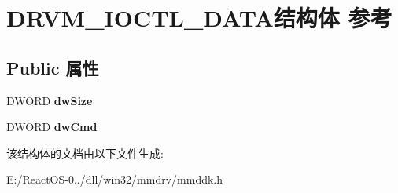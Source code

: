 \hypertarget{struct_d_r_v_m___i_o_c_t_l___d_a_t_a}{}\section{D\+R\+V\+M\+\_\+\+I\+O\+C\+T\+L\+\_\+\+D\+A\+T\+A结构体 参考}
\label{struct_d_r_v_m___i_o_c_t_l___d_a_t_a}
\subsection*{Public 属性}
\begin{DoxyCompactItemize}
\item 
\mbox{\label{struct_d_r_v_m___i_o_c_t_l___d_a_t_a_a7da3b53bf530dd4442ebd4b93db66336}} 
D\+W\+O\+RD {\bfseries dw\+Size}
\item 
\mbox{\label{struct_d_r_v_m___i_o_c_t_l___d_a_t_a_abb5dcd35b51fc6f7653201da226640b4}} 
D\+W\+O\+RD {\bfseries dw\+Cmd}
\end{DoxyCompactItemize}


该结构体的文档由以下文件生成\+:\begin{DoxyCompactItemize}
\item 
E\+:/\+React\+O\+S-\/0../dll/win32/mmdrv/mmddk.\+h\end{DoxyCompactItemize}
